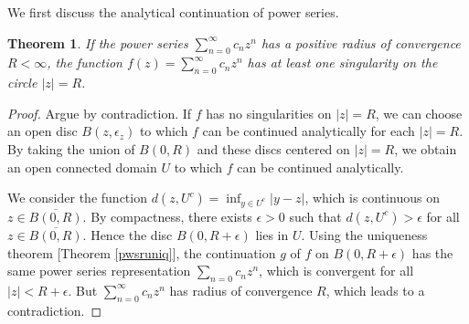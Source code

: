 \documentclass{article}
\numberwithin{equation}{section}
\newcommand{\ol}{\overline}
\theoremstyle{plain}
\newtheorem{theorem}{Theorem}[section]
\theoremstyle{definition}
\begin{document}
We first discuss the analytical continuation of power series.
\begin{theorem}\label{analcontsing}
If the power series $\sum_{n=0}^\infty c_nz^n$ has a positive radius of convergence $R<\infty$, the function $f(z)=\sum_{n=0}^\infty c_nz^n$ has at least one singularity on the circle $\vert z\vert=R$.
\end{theorem}
\begin{proof}
Argue by contradiction. If $f$ has no singularities on $\vert z\vert=R$, we can choose an open disc $B(z,\epsilon_z)$ to which $f$ can be continued analytically for each $\vert z\vert=R$. By taking the union of $B(0,R)$ and these discs centered on $\vert z\vert=R$, we obtain an open connected domain $U$ to which $f$ can be continued analytically. 

We consider the function $d(z,U^c)=\inf_{y\in U^c}\vert y-z\vert$, which is continuous on $z\in\ol{B(0,R)}$. By compactness, there exists $\epsilon>0$ such that $d(z,U^c)>\epsilon$ for all $z\in\ol{B(0,R)}$. Hence the disc $B(0,R+\epsilon)$ lies in $U$. Using the uniqueness theorem [Theorem \ref{pwsruniq}], the continuation $g$ of $f$ on $B(0,R+\epsilon)$ has the same power series representation $\sum_{n=0}c_nz^n$, which is convergent for all $\vert z\vert <R+\epsilon$. But $\sum_{n=0}^\infty c_nz^n$ has radius of convergence $R$, which leads to a contradiction.
\end{proof}
\end{document}
